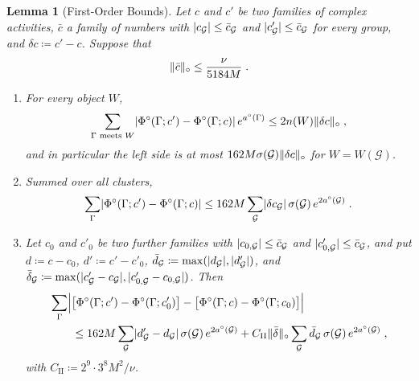\documentclass[11pt]{preprint}
\DeclarePairedDelimiter{\abs}{\lvert}{\rvert}
\DeclarePairedDelimiter{\norm}{\lVert}{\rVert}
\numberwithin{equation}{section}
\newtheorem{lemma}{Lemma}[section]
\theoremstyle{definition}
\theoremstyle{remark}
\theoremstyle{plain}
\begin{document}
\begin{lemma}[First-Order Bounds]\label{lem:first-order}
Let $c$ and $c'$ be two families of complex activities, $\bar c$ a family of numbers with $\abs{c_{\mathcal G}} \leq \bar c_{\mathcal G}$ and $\abs{c'_{\mathcal G}} \leq \bar c_{\mathcal G}$ for every group, and $\delta c \coloneqq c' - c$. Suppose that
\begin{equation}\label{eq:first-order-room}
    \norm{\bar c}_\circ \leq \frac{\nu}{5184M}\;.
\end{equation}
\begin{enumerate}[label=(\alph*)]
\item For every object $W$,
\begin{equation}\label{eq:first-order-root}
    \sum_{\Gamma \text{ meets } W}\abs{\Phi^\circ(\Gamma; c') - \Phi^\circ(\Gamma; c)}\,e^{a^\circ(\Gamma)} \leq 2n(W)\norm{\delta c}_\circ\;,
\end{equation}
and in particular the left side is at most $162M\sigma(\mathcal G)\norm{\delta c}_\circ$ for $W = W(\mathcal G)$.
\item Summed over all clusters,
\begin{equation}\label{eq:first-order-sum}
    \sum_\Gamma\abs{\Phi^\circ(\Gamma; c') - \Phi^\circ(\Gamma; c)} \leq 162M\sum_{\mathcal G}\abs{\delta c_{\mathcal G}}\,\sigma(\mathcal G)\,e^{2a^\circ(\mathcal G)}\;.
\end{equation}
\item Let $c_0$ and $c'_0$ be two further families with $\abs{c_{0,\mathcal G}} \leq \bar c_{\mathcal G}$ and $\abs{c'_{0,\mathcal G}} \leq \bar c_{\mathcal G}$, and put $d \coloneqq c - c_0$, $d' \coloneqq c' - c'_0$, $\bar d_{\mathcal G} \coloneqq \max(\abs{d_{\mathcal G}}, \abs{d'_{\mathcal G}})$, and $\bar\delta_{\mathcal G} \coloneqq \max(\abs{c'_{\mathcal G} - c_{\mathcal G}}, \abs{c'_{0,\mathcal G} - c_{0,\mathcal G}})$. Then
\begin{equation}\label{eq:second-difference}
\begin{aligned}
    &\sum_\Gamma\Bigl\lvert\bigl[\Phi^\circ(\Gamma; c') - \Phi^\circ(\Gamma; c'_0)\bigr] - \bigl[\Phi^\circ(\Gamma; c) - \Phi^\circ(\Gamma; c_0)\bigr]\Bigr\rvert\\
    &\qquad \leq 162M\sum_{\mathcal G}\abs{d'_{\mathcal G} - d_{\mathcal G}}\,\sigma(\mathcal G)\,e^{2a^\circ(\mathcal G)} + C_{\mathrm{II}}\norm{\bar\delta}_\circ\sum_{\mathcal G}\bar d_{\mathcal G}\,\sigma(\mathcal G)\,e^{2a^\circ(\mathcal G)}\;,
\end{aligned}
\end{equation}
with $C_{\mathrm{II}} \coloneqq 2^{9}\cdot 3^{8}M^2/\nu$.
\end{enumerate}
\end{lemma}
\end{document}
